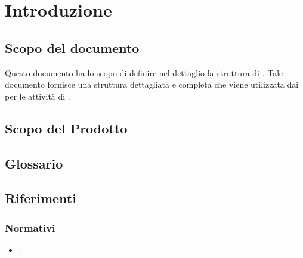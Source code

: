 \newpage
\section{Introduzione}
\subsection{Scopo del documento}
Questo documento ha lo scopo di definire nel dettaglio la struttura di \capitolato. Tale documento fornisce una struttura dettagliata e completa che viene utilizzata dai \ProgrP per le attività di .
\subsection{Scopo del Prodotto}
\scopoProdotto

\subsection{Glossario}
\descrizioneGlossario

\subsection{Riferimenti}
\subsubsection{Normativi}
\riferimentiNormativi
\begin{itemize}
\item \textbf{\AdR}: \analisiDeiRequisiti
\end{itemize}

